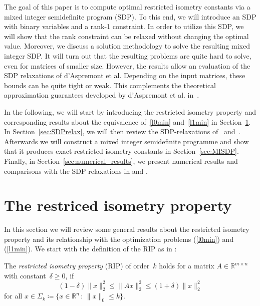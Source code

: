 \documentclass[a4paper,11pt,1p]{elsarticle}
\newcommand{\suchthat}{\,:\,}
\newcommand{\define}{\coloneqq}
\newcommand{\Norm}[2]{\lVert{#1}\rVert_{#2}}
\newcommand{\R}{\mathds{R}}
\newcommand{\comment}[1]{\marginpar{\raggedright\tiny {#1}}}
\begin{document}
The goal of this paper is to compute optimal restricted isometry constants
via a mixed integer semidefinite program (SDP). To this end, we will
introduce an SDP with binary variables and a rank-1 constraint. In order to
utilize this SDP, we will show that the rank constraint can be relaxed
without changing the optimal value. Moreover, we discuss a solution
methodology to solve the resulting mixed integer SDP. It will turn out that
the resulting problems are quite hard to solve, even for matrices of
smaller size. However, the results allow an evaluation of the SDP
relaxations of d'Aspremont et al. Depending on the input matrices, these
bounds can be quite tight or weak. This complements the theoretical
approximation guarantees developed by d'Aspremont et
al. in~\cite{AspBG14}.\comment{Also add reference to~\cite{AspBG14} in
  Section~3.}

In the following, we will start by introducing the restricted isometry
property and corresponding results about the equivalence of~\eqref{l0min}
and~\eqref{l1min} in Section~\ref{sec:RIP}. In Section~\ref{sec:SDPrelax},
we will then review the SDP-relaxations of~\cite{Asp07}
and~\cite{Asp08}. Afterwards we will construct a mixed integer semidefinite
programme and show that it produces exact restricted isometry constants in
Section~\ref{sec:MISDP}. Finally, in Section~\ref{sec:numerical_results},
we present numerical results and comparisons with the SDP relaxations in
\cite{Asp07} and \cite{Asp08}.

\section{The restriced isometry property}
\label{sec:RIP}

In this section we will review some general results about the restricted
isometry property and its relationship with the optimization problems
(\ref{l0min}) and (\ref{l1min}). We start with the definition of the RIP as
in \cite{CT05}:

\begin{definition}\label{ripdef}
  The \emph{restricted isometry property} (RIP) of order~$k$ holds for a
  matrix $A \in \R^{m \times n}$ with constant~$\delta \geq 0$, if
  \begin{equation}\label{rip}
    (1 - \delta) \Norm{x}{2}^2 \leq \Norm{Ax}{2}^2 \leq (1+\delta) \Norm{x}{2}^2
  \end{equation}
  for all $x \in \Sigma_k \define \{x \in \R^n \suchthat \Norm{x}{0} \leq k\}$.
\end{definition}
\end{document}
